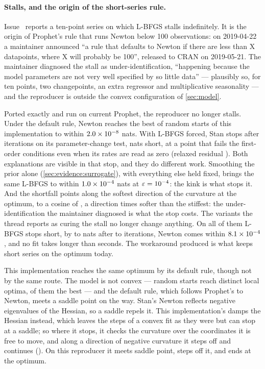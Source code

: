 \paragraph{Stalls, and the origin of the short-series rule.}
Issue~ reports a ten-point series on which L-BFGS stalls
indefinitely. It is the origin of Prophet's rule that runs Newton below 100
observations: on 2019-04-22 a maintainer announced ``a rule that defaults to Newton if
there are less than X datapoints, where X will probably be 100'', released to CRAN on
2019-05-21.
The maintainer diagnosed the stall as under-identification, ``happening because the
model parameters are not very well specified by so little data'' --- plausibly so, for
ten points, two changepoints, an extra regressor and multiplicative seasonality --- and
the reproducer is outside the convex configuration of \cref{sec:model}.

Ported exactly and run on current Prophet, the reproducer no longer stalls. Under
the default rule, Newton reaches the best of \StallStarts{} random starts of this
implementation to within $2.0\times10^{-8}$ nats. With L-BFGS forced, Stan stops
after \StallLbfgsIter{} iterations on its parameter-change test, \StallLbfgsShort{}
nats short, at a point that fails the first-order conditions even when its rates are
read as zero (relaxed residual \StallLbfgsRelaxed). Both explanations are visible in
that stop, and they do different work. Smoothing the prior alone (\cref{sec:evidence:surrogate}),
with everything else held fixed, brings the same L-BFGS to within $1.0\times10^{-4}$
nats at $\varepsilon = 10^{-4}$: the kink is what stops it. And the shortfall
points along the softest direction of the curvature at the optimum, to a cosine of
\StallLbfgsCosine, a direction \StallCondition{} times softer than the stiffest: the
under-identification the maintainer diagnosed is what the stop costs. The variants
the thread reports as curing the stall no longer change anything. On all
\StallVariants{} of them L-BFGS stops short, by \StallVariantShortMin{} to
\StallVariantShortMax{} nats after \StallVariantIterMin{} to \StallVariantIterMax{}
iterations, Newton comes within $8.1\times10^{-4}$, and no fit takes longer than
\StallSecondsMax{} seconds. The workaround  produced is what keeps
short series on the optimum today.

This implementation reaches the same optimum by its default rule, though not by the
same route. The model is not convex --- \StallStarts{} random starts reach \StallOptima{}
distinct local optima, \StallBestReach{} of them the best --- and the default rule, which
follows Prophet's to Newton, meets a saddle point on the way. Stan's Newton reflects
negative eigenvalues of the Hessian, so a saddle repels it. This implementation's damps
the Hessian instead, which leaves the steps of a convex fit as they were but can stop at
a saddle; so where it stops, it checks the curvature over the coordinates it is free to
move, and along a direction of negative curvature it steps off and continues
(). On this reproducer it meets \StallOursEscapes{} saddle point,
steps off it, and ends at the optimum.

